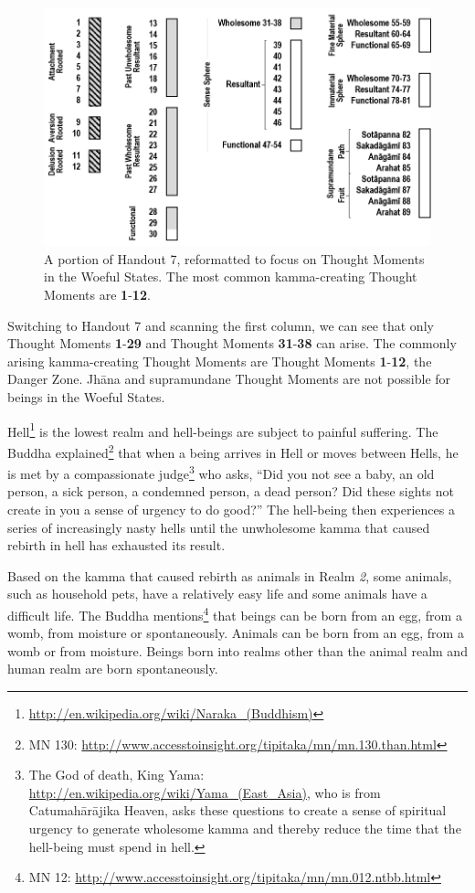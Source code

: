 \begin{figure}[h]
\centering
\includegraphics[width=0.7\linewidth]{./Diagrams/Woeful}
\caption{A portion of Handout 7, reformatted to focus on Thought Moments in the Woeful States. The most common kamma-creating Thought Moments are \textbf{1}-\textbf{12}.}
\label{fig:Woeful}
\end{figure}

Switching to Handout 7 and scanning the first column, we can see that only Thought Moments \textbf{1}-\textbf{29} and Thought Moments \textbf{31}-\textbf{38} can arise. The commonly arising kamma-creating Thought Moments are Thought Moments \textbf{1}-\textbf{12}, the Danger Zone. Jhāna and supramundane Thought Moments are not possible for beings in the Woeful States.

Hell\footnote{\url{http://en.wikipedia.org/wiki/Naraka_(Buddhism)}} is the lowest realm and hell-beings are subject to painful suffering. The Buddha explained\footnote{MN 130: \url{http://www.accesstoinsight.org/tipitaka/mn/mn.130.than.html}} that when a being arrives in Hell or moves between Hells, he is met by a compassionate judge\footnote{The God of death, King Yama: \url{http://en.wikipedia.org/wiki/Yama_(East_Asia)}, who is from Catumahārājika Heaven, asks these questions to create a sense of spiritual urgency to generate wholesome kamma and thereby reduce the time that the hell-being must spend in hell.} who asks, “Did you not see a baby, an old person, a sick person, a condemned person, a dead person? Did these sights not create in you a sense of urgency to do good?” The hell-being then experiences a series of increasingly nasty hells until the unwholesome kamma that caused rebirth in hell has exhausted its result.

Based on the kamma that caused rebirth as animals in Realm \textit{2}, some animals, such as household pets, have a relatively easy life and some animals have a difficult life. The Buddha mentions\footnote{MN 12: \url{http://www.accesstoinsight.org/tipitaka/mn/mn.012.ntbb.html}} that beings can be born from an egg, from a womb, from moisture or spontaneously. Animals can be born from an egg, from a womb or from moisture. Beings born into realms other than the animal realm and human realm are born spontaneously.

